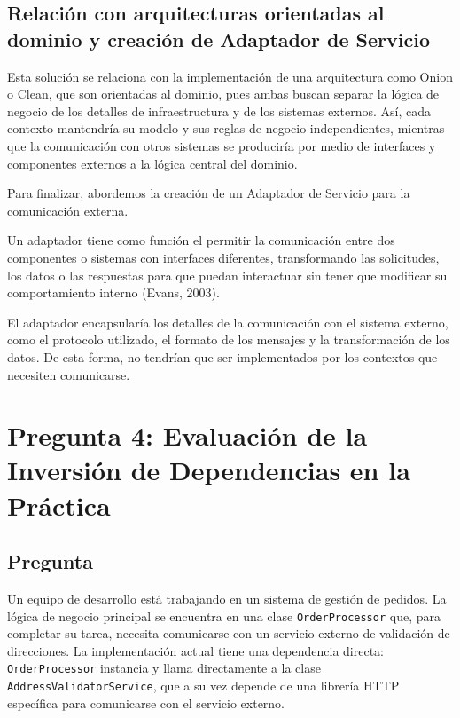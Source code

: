 \documentclass[12pt, a4paper]{article}
\begin{document}
        \subsection{Relación con arquitecturas orientadas al dominio y creación de Adaptador de Servicio}
        Esta solución se relaciona con la implementación de una arquitectura como Onion o Clean, que son orientadas al dominio, pues ambas buscan separar la lógica de negocio de los detalles de infraestructura y de los sistemas externos. Así, cada contexto mantendría su modelo y sus reglas de negocio independientes, mientras que la comunicación con otros sistemas se produciría por medio de interfaces y componentes externos a la lógica central del dominio.

        Para finalizar, abordemos la creación de un Adaptador de Servicio para la comunicación externa.

        Un adaptador tiene como función el permitir la comunicación entre dos componentes o sistemas con interfaces diferentes, transformando las solicitudes, los datos o las respuestas para que puedan interactuar sin tener que modificar su comportamiento interno (Evans, 2003).

        El adaptador encapsularía los detalles de la comunicación con el sistema externo, como el protocolo utilizado, el formato de los mensajes y la transformación de los datos. De esta forma, no tendrían que ser implementados por los contextos que necesiten comunicarse.

        \section[Evaluación de la Inversión de Dependencias en la Práctica]{Pregunta 4: Evaluación de la Inversión de Dependencias en la Práctica}

        \subsection{Pregunta}
        Un equipo de desarrollo está trabajando en un sistema de gestión de pedidos. La lógica de negocio principal se encuentra en una clase \texttt{OrderProcessor} que, para completar su tarea, necesita comunicarse con un servicio externo de validación de direcciones. La implementación actual tiene una dependencia directa: \texttt{OrderProcessor} instancia y llama directamente a la clase \texttt{AddressValidatorService}, que a su vez depende de una librería HTTP específica para comunicarse con el servicio externo.
\end{document}
